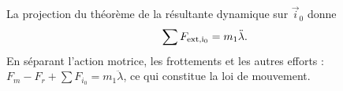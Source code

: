 \begin{corrigebox}
La projection du théorème de la résultante dynamique sur
            $\vec i_0$ donne
            \[\sum F_{\rm ext,i_0}=m_1\ddot\lambda.\]
            En séparant l'action motrice, les frottements et les autres efforts :
            $F_m-F_r+\sum F_{i_0}=m_1\ddot\lambda$, ce qui constitue la loi de mouvement.
\end{corrigebox}
